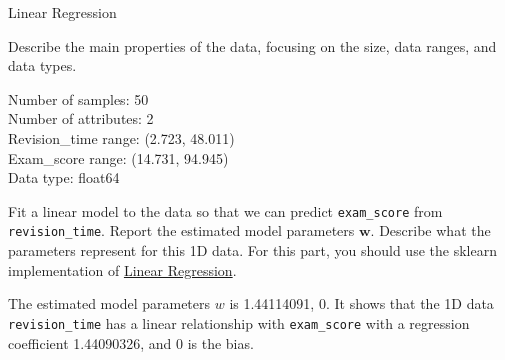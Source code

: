 \documentclass[12pt]{article}
\begin{document}
\clearpage

\begin{question}{Linear Regression}

\begin{subquestion}{Describe the main properties of the data, focusing on the size, data ranges, and data types.}

\begin{answerbox}{10em}
Number of samples: 50\\
Number of attributes: 2\\
Revision_time range: (2.723, 48.011)\\
Exam_score range: (14.731, 94.945)\\
Data type: float64
\end{answerbox}



\end{subquestion}




%
%
\begin{subquestion}{Fit a linear model to the data so that we can predict \texttt{exam\_score} from \texttt{revision\_time}. 
Report the estimated model parameters $\mathbf{w}$. 
Describe what the parameters represent for this 1D data. 
For this part, you should use the sklearn implementation of \href{https://scikit-learn.org/0.19/modules/generated/sklearn.linear_model.LinearRegression.html}{Linear Regression}.\\
}


\begin{answerbox}{10em}
The estimated model parameters $w$ is {1.44114091, 0}. It shows that the 1D data \texttt{revision\_time} has a linear relationship with \texttt{exam\_score} with a regression coefficient 1.44090326, and 0 is the bias.
\end{answerbox}



\end{subquestion}



\end{question}
\end{document}

